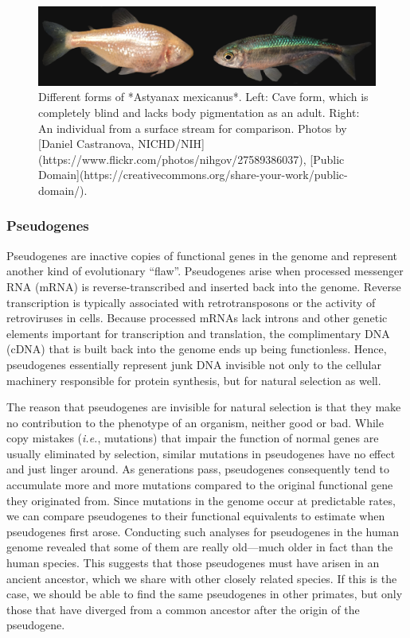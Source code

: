 \documentclass[
]{book}
\begin{document}
\begin{figure}
\includegraphics[width=1\linewidth]{images/astyanax} \caption{Different forms of *Astyanax mexicanus*. Left: Cave form, which is completely blind and lacks body pigmentation as an adult. Right: An individual from a surface stream for comparison. Photos by [Daniel Castranova, NICHD/NIH](https://www.flickr.com/photos/nihgov/27589386037), [Public Domain](https://creativecommons.org/share-your-work/public-domain/).}\label{fig:astyanax}
\end{figure}

\hypertarget{pseudogenes}{%
\subsubsection*{Pseudogenes}\label{pseudogenes}}

Pseudogenes are inactive copies of functional genes in the genome and represent another kind of evolutionary ``flaw''. Pseudogenes arise when processed messenger RNA (mRNA) is reverse-transcribed and inserted back into the genome. Reverse transcription is typically associated with retrotransposons or the activity of retroviruses in cells. Because processed mRNAs lack introns and other genetic elements important for transcription and translation, the complimentary DNA (cDNA) that is built back into the genome ends up being functionless. Hence, pseudogenes essentially represent junk DNA invisible not only to the cellular machinery responsible for protein synthesis, but for natural selection as well.

The reason that pseudogenes are invisible for natural selection is that they make no contribution to the phenotype of an organism, neither good or bad. While copy mistakes (\emph{i.e.}, mutations) that impair the function of normal genes are usually eliminated by selection, similar mutations in pseudogenes have no effect and just linger around. As generations pass, pseudogenes consequently tend to accumulate more and more mutations compared to the original functional gene they originated from. Since mutations in the genome occur at predictable rates, we can compare pseudogenes to their functional equivalents to estimate when pseudogenes first arose. Conducting such analyses for pseudogenes in the human genome revealed that some of them are really old---much older in fact than the human species. This suggests that those pseudogenes must have arisen in an ancient ancestor, which we share with other closely related species. If this is the case, we should be able to find the same pseudogenes in other primates, but only those that have diverged from a common ancestor after the origin of the pseudogene.
\end{document}
